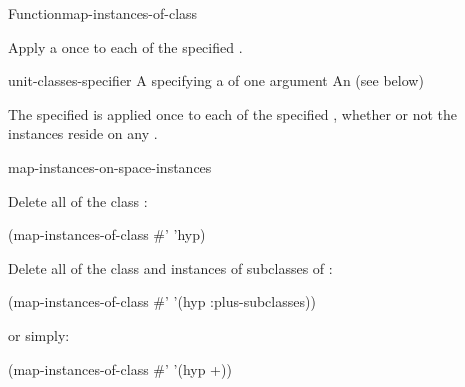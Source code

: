 \documentclass[10pt,twoside,english,pdftex]{article}
\begin{document}
\begin{functiondoc}{Function}{map-instances-of-class}%
{}
%
%

\fnsyntax

\fnpurpose Apply a  once to each  of the
specified . 

\fnpackage {}

\fnmodule {}

\fnargs
\begin{args}{unit-classes-specifier}
\arg[function] A  specifying a
  of one argument
 An 
(see below)
\end{args}

\fndsyntax
\W\supp\tabletop
\unitclassesspec
\subclassingspec

\fndescription The specified  is applied once to each
 of the specified , whether
or not the instances reside on any .

\begin{alsos}{map-instances-on-space-instances}
\end{alsos}

\fnexamples
Delete all  of the class :
%
\W\supp
\begin{example}
  (map-instances-of-class #' 'hyp)
\end{example} 
%
Delete all  of the class  and
instances of subclasses of :
%
\W\supp\notpretop
\begin{example}
  (map-instances-of-class #' '(hyp :plus-subclasses))
\end{example} 
%
or simply:
%
\W\supp\notpretop
\begin{example}
  (map-instances-of-class #' '(hyp +))
\end{example} 


\end{functiondoc}
\end{document}
